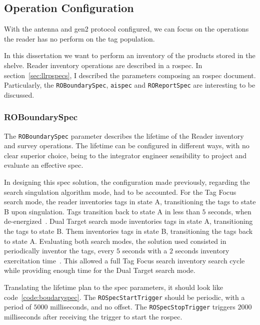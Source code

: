 \subsection{Operation Configuration}

With the antenna and \ac{gen2} protocol configured, we can focus on the operations the reader has no perform on the tag population.

In this dissertation we want to perform an inventory of the products stored in the shelve. Reader inventory operations are described in a \ac{rospec}.
In section~\ref{sec:llrpspecs}, I described the parameters composing an \ac{rospec} document. Particularly, the \texttt{ROBoundarySpec}, \texttt{\acs{aispec}} and \texttt{ROReportSpec} are interesting to be discussed.

\subsubsection{ROBoundarySpec}

The \texttt{ROBoundarySpec} parameter describes the lifetime of the Reader inventory and survey operations.
The lifetime can be configured in different ways, with no clear superior choice, being to the integrator engineer sensibility to project and evaluate an effective \ac{spec}.

In designing this \ac{spec} solution, the configuration made previously, regarding the search singulation algorithm mode, had to be accounted.
For the Tag Focus search mode, the reader inventories tags in state A, transitioning the tags to state B upon singulation. Tags transition back to state A in less than $5$ seconds, when de-energized~\cite{ImpinjOctaneLLRP}.
Dual Target search mode inventories tags in state A, transitioning the tags to state B. Them inventories tags in state B, transitioning the tags back to state A.
Evaluating both search modes, the solution used consisted in periodically inventor the tags, every $5$ seconds with a $2$ seconds inventory exercitation time~\cite{ImpinjOctaneLLRP, UnderstandingEPCGen2}.
This allowed a full Tag Focus search inventory search cycle while providing enough time for the Dual Target search mode.

Translating the lifetime plan to the \ac{spec} parameters, it should look like code~\ref{code:boudaryspec}. The \texttt{ROSpecStartTrigger} should be periodic, with a period of $5000$ milliseconds, and no offset. The \texttt{ROSpecStopTrigger} triggers $2000$ milliseconds after receiving the trigger to start the \ac{rospec}. 

